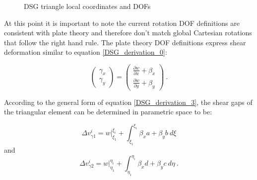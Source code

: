 \begin{figure}[H]
	\centering
	\caption{\label{DSG_derivation_pic2}DSG triangle local coordinates and DOFs \cite{Ngu13}}
\end{figure}

At this point it is important to note the current rotation DOF definitions are consistent with plate theory and therefore don't match global Cartesian rotations that follow the right hand rule. The plate theory DOF definitions express shear deformation similar to equation \ref{DSG_derivation_0}:

\begin{equation} 
\begin{pmatrix}
\gamma_x \\
\gamma_y
\end{pmatrix}
=
\begin{pmatrix}
\frac{\partial w}{\partial x} +  \beta_x \\
\frac{\partial w}{\partial y} +  \beta_y
\end{pmatrix}
\label{DSG_derivation_5}\ .
\end{equation}

According to the general form of equation \ref{DSG_derivation_3}, the shear gaps of the triangular element can be determined in parametric space to be:

\begin{equation} 
\Delta v_{\gamma1}^i 
= w |_{\xi_1}^{\xi_i} +  \int_{\xi_1}^{\xi_i} \beta_x a +  \beta_y b \ d\xi
\label{DSG_derivation_6}
\end{equation}
and
\begin{equation} 
\Delta v_{\gamma2}^i 
= w |_{\eta_1}^{\eta_i} +  \int_{\eta_1}^{\eta_i} \beta_x d +  \beta_y c \ d\eta
\label{DSG_derivation_7}\ .
\end{equation}

